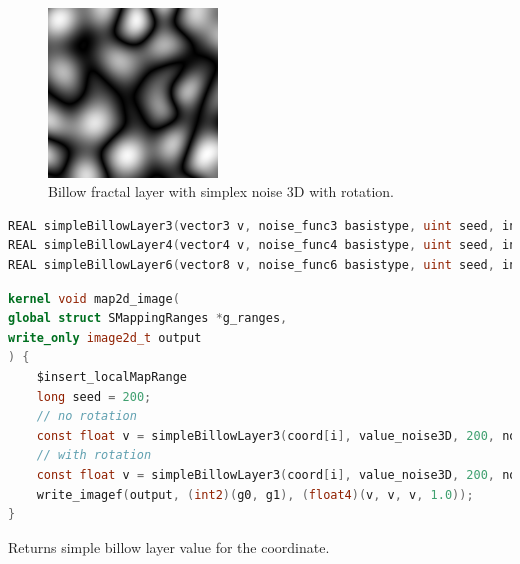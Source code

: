 \begin{figure}[h]
\centering
\includegraphics[width=0.4\textwidth]{out/simpleBillowLayer3/simpleBillowLayer3_simplex_noise3D_noInterp_rot.png}
\caption{Billow fractal layer with simplex noise 3D with rotation.}
\label{fig:billow_fractal_layer3_simplex_noise3D_noInterp_rot}
\end{figure}

\begin{lstlisting}[caption={Definition of billow fractal layer functions},label={lst:billow_fractal_layer_definition},language=OpenCL]
REAL simpleBillowLayer3(vector3 v, noise_func3 basistype, uint seed, interp_func interp, REAL layerscale, REAL layerfreq, bool rot, REAL angle, REAL ax, REAL ay, REAL az);
REAL simpleBillowLayer4(vector4 v, noise_func4 basistype, uint seed, interp_func interp, REAL layerscale, REAL layerfreq, bool rot, REAL angle, REAL ax, REAL ay, REAL az);
REAL simpleBillowLayer6(vector8 v, noise_func6 basistype, uint seed, interp_func interp, REAL layerscale, REAL layerfreq, bool rot, REAL angle, REAL ax, REAL ay, REAL az);
\end{lstlisting}

\begin{lstlisting}[caption={Example for billow fractal layer functions},label={lst:billow_fractal_layer_example},language=OpenCL]
kernel void map2d_image(
global struct SMappingRanges *g_ranges,
write_only image2d_t output
) {
    $insert_localMapRange
    long seed = 200;
    // no rotation
    const float v = simpleBillowLayer3(coord[i], value_noise3D, 200, noInterp, 1, 0.125, false, 0.0, 0.0, 0.0, 0.0);
    // with rotation
    const float v = simpleBillowLayer3(coord[i], value_noise3D, 200, noInterp, 1, 0.125, true, 1.57, 1.0, 0.0, 0.0);
    write_imagef(output, (int2)(g0, g1), (float4)(v, v, v, 1.0));
}
\end{lstlisting}

Returns simple billow layer value for the coordinate.


